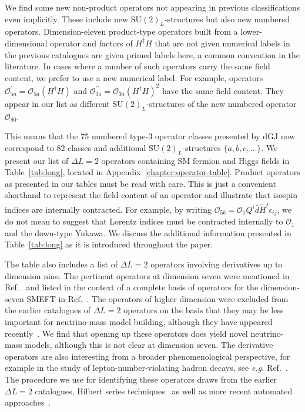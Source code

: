 We find some new non-product operators not appearing in previous classifications
even implicitly. These include new $\mathrm{SU}(2)_L$-structures but also new
numbered operators. Dimension-eleven product-type operators built from a
lower-dimensional operator and factors of $H^\dagger H$ that are not given
numerical labels in the previous catalogues are given primed labels here, a
common convention in the literature. In cases where a number of such operators
carry the same field content, we prefer to use a new numerical label. For
example, operators $\mathcal{O}_{5a}^\prime = \mathcal{O}_{5a} (H^\dagger H)$
and $\mathcal{O}_{3a}^{\prime \prime} = \mathcal{O}_{3a}(H^\dagger H)^2$ have
the same field content. They appear in our list as different
$\mathrm{SU}(2)_L$-structures of the new numbered operator $\mathcal{O}_{80}$.

This means that the 75 numbered type-3 operator classes presented by dGJ now
correspond to 82 classes and additional $\mathrm{SU}(2)_{L}$-structures
$\{a, b, c, \ldots\}$. We present our list of $\Delta L = 2$ operators
containing SM fermion and Higgs fields in Table~\ref{tab:long}, located in
Appendix~\ref{chapter:operator-table}. Product operators as presented in our
tables must be read with care. This is just a convenient shorthand to represent
the field-content of an operator and illustrate that isospin indices are
internally contracted. For example, by writing
$\mathcal{O}_{5b} = \mathcal{O}_{1} Q^{i} \bar{d} \tilde{H}^{j} \epsilon_{ij}$,
we do not mean to suggest that Lorentz indices must be contracted internally to
$\mathcal{O}_{1}$ and the down-type Yukawa. We discuss the additional
information presented in Table~\ref{tab:long} as it is introduced throughout the
paper.

The table also includes a list of $\Delta L = 2$ operators involving derivatives
up to dimension nine. The pertinent operators at dimension seven were mentioned
in Ref.~\cite{Babu:2001ex} and listed in the context of a complete basis of
operators for the dimension-seven SMEFT in Ref.~\cite{Lehman:2014jma}. The
operators of higher dimension were excluded from the earlier catalogues of
$\Delta L = 2$ operators on the basis that they may be less important for
neutrino-mass model building, although they have appeared
recently~\cite{Li:2020xlh}. We find that opening up these operators does yield
novel neutrino-mass models, although this is not clear at dimension seven. The
derivative operators are also interesting from a broader phenomenological
perspective, for example in the study of lepton-number-violating hadron decays,
see \textit{e.g.} Ref.~\cite{Cata:2019wbu}. The procedure we use for identifying
these operators draws from the earlier $\Delta L = 2$ catalogues, Hilbert series
techniques~\cite{Lehman:2015via, Henning:2015daa, Lehman:2015coa,
  Henning:2015alf, Henning:2017fpj} as well as more recent automated
approaches~\cite{Gripaios:2018zrz, Criado:2019ugp, Fonseca:2011sy,
  Fonseca:2017lem, Fonseca:2019yya, Banerjee:2020bym}.

